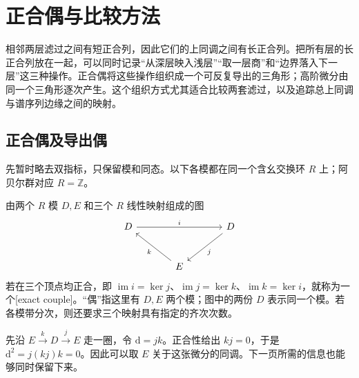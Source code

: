 
% 
% 

\section{正合偶与比较方法}
\label{g2:sec:1003}

相邻两层滤过之间有短正合列，因此它们的上同调之间有长正合列。把所有层的长正合列放在一起，可以同时记录“从深层映入浅层”“取一层商”和“边界落入下一层”这三种操作。正合偶将这些操作组织成一个可反复导出的三角形；高阶微分由同一个三角形逐次产生。这个组织方式尤其适合比较两套滤过，以及追踪总上同调与谱序列边缘之间的映射。

\subsection{正合偶及导出偶}
\label{g2:subsec:1003:01}

先暂时略去双指标，只保留模和同态。以下各模都在同一个含幺交换环 \(R\) 上；阿贝尔群对应 \(R=\mathbb Z\)。

\begin{definition}[正合偶]\label{g2:def:exact-couple}
	由两个 \(R\) 模 \(D,E\) 和三个 \(R\) 线性映射组成的图
	\[
		\begin{tikzcd}[column sep=large,row sep=large]
			D \arrow[rr,"i"] && D \arrow[dl,"j"] \\
			& E \arrow[ul,"k"] &
		\end{tikzcd}
	\]
	若在三个顶点均正合，即 \(\operatorname{im}i=\ker j\)、\(\operatorname{im}j=\ker k\)、\(\operatorname{im}k=\ker i\)，就称为一个[exact couple]。“偶”指这里有 \(D,E\) 两个模；图中的两份 \(D\) 表示同一个模。若各模带分次，则还要求三个映射具有指定的齐次次数。
\end{definition}

先沿 \(E\xrightarrow{k}D\xrightarrow{j}E\) 走一圈，令 \(\mathrm d=jk\)。正合性给出 \(kj=0\)，于是 \(\mathrm d^2=j(kj)k=0\)。因此可以取 \(E\) 关于这张微分的同调。下一页所需的信息也能够同时保留下来。

